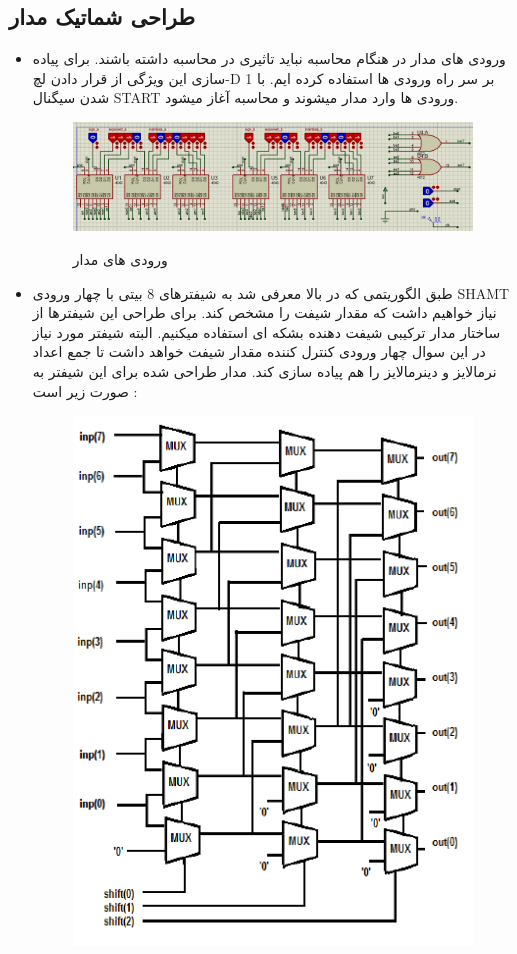\documentclass[twoside]{article}
\begin{document}
	\subsection*{طراحی شماتیک مدار}
	\begin{itemize}
		\item
		ورودی های مدار در هنگام محاسبه نباید تاثیری در محاسبه داشته باشند. برای پیاده سازی این ویژگی از قرار دادن لچ-D بر سر راه ورودی ها استفاده کرده ایم. با 1 شدن سیگنال START ورودی ها وارد مدار میشوند و محاسبه آغاز میشود.
			\begin{figure}[h!]
			\begin{center}
				\includegraphics[scale=0.5]{inputs}‎
				\caption{ورودی های مدار}
			\end{center}
		\end{figure} 
		\item
		طبق الگوریتمی که در بالا معرفی شد به شیفترهای 8 بیتی با چهار ورودی SHAMT نیاز خواهیم داشت که مقدار شیفت را مشخص کند. برای طراحی این شیفترها از ساختار مدار ترکیبی شیفت دهنده بشکه ای استفاده میکنیم. البته شیفتر مورد نیاز در این سوال چهار ورودی کنترل کننده مقدار شیفت خواهد داشت تا جمع اعداد نرمالایز و دینرمالایز را هم پیاده سازی کند.	مدار طراحی شده برای این شیفتر به صورت زیر است :
		\begin{figure}[h!]
			\begin{center}
				\includegraphics[scale=0.2]{barrel_shifter}‎

\end{center}
\end{figure}
\end{itemize}
\end{document}
